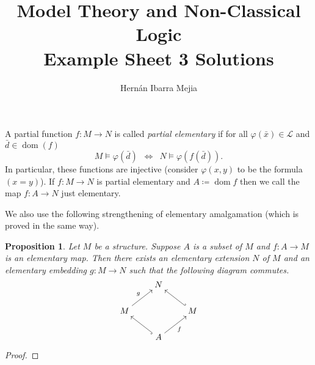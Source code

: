 \documentclass{article}
\theoremstyle{theorem}
\newtheorem{prop}{Proposition}
\DeclareMathOperator{\dom}{dom}
\begin{document}
	\title{Model Theory and Non-Classical Logic\\ Example Sheet 3 Solutions}
	\author{Hernán Ibarra Mejia}
	\maketitle
	A partial function $f\colon M \to N$ is called \emph{partial elementary} if for all $\varphi(\bar{x})\in\mathcal{L}$ and $\bar{d}\in \dom(f)$
	\[
	M \models \varphi(\bar{d}) \,\,\,\iff\,\,\, N \models \varphi(f(\bar{d})).
	\]
	In particular, these functions are injective (consider $\varphi(x,y)$ to be the formula $(x=y)$). If $f\colon M \to N$ is partial elementary and $A \coloneqq \dom f$ then we call the map $f\colon A \to N$ just elementary.
	
	We also use the following strengthening of elementary amalgamation (which is proved in the same way).
	\begin{prop}
		Let $M$ be a structure. Suppose $A$ is a subset of $M$ and $f\colon A \to M$ is an elementary map. Then there exists an elementary extension $N$ of $M$ and an elementary embedding $g\colon M \to N$ such that the following diagram commutes.
		\[\begin{tikzcd}[cramped]
			& N \\
			M && M \\
			& A
			\arrow["g", from=2-1, to=1-2]
			\arrow[hook', from=2-3, to=1-2]
			\arrow[hook, from=3-2, to=2-1]
			\arrow["f"', from=3-2, to=2-3]
		\end{tikzcd}\]
	\end{prop}
	\begin{proof}
		
	\end{proof}
\end{document}
